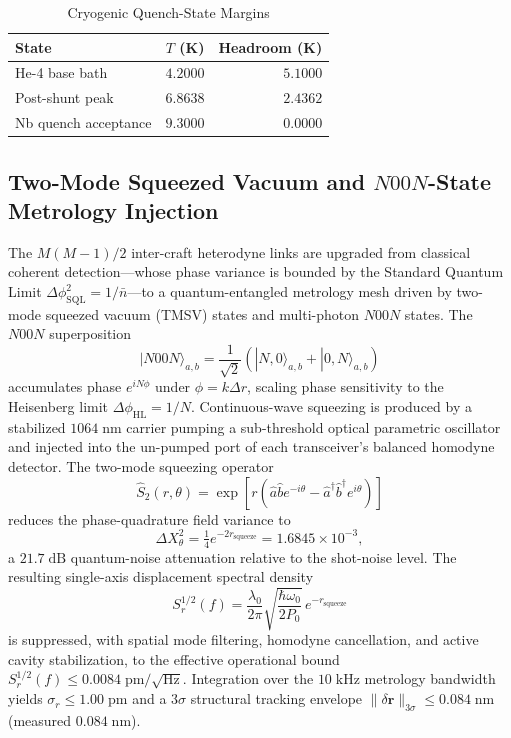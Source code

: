 \documentclass[10pt,twocolumn]{IEEEtran}
\begin{document}
\begin{table}[t]
\caption{Cryogenic Quench-State Margins}
\label{tab:quench_states}
\centering
\footnotesize
\begin{tabular}{@{}lrr@{}}
\toprule
State & $T$ (K) & Headroom (K) \\
\midrule
He-4 base bath & $4.2000$ & $5.1000$ \\
Post-shunt peak & $6.8638$ & $2.4362$ \\
Nb quench acceptance & $9.3000$ & $0.0000$ \\
\bottomrule
\end{tabular}
\end{table}

\subsection{Two-Mode Squeezed Vacuum and $N00N$-State Metrology Injection}
\label{sec:squeezed_metrology}

The $M(M-1)/2$ inter-craft heterodyne links are upgraded from classical
coherent detection---whose phase variance is bounded by the Standard
Quantum Limit $\Delta\phi_{\mathrm{SQL}}^{2}=1/\bar{n}$---to a
quantum-entangled metrology mesh driven by two-mode squeezed vacuum
(TMSV) states and multi-photon $N00N$ states.  The $N00N$ superposition
\begin{equation}
|N00N\rangle_{a,b}=\frac{1}{\sqrt{2}}
\left(|N,0\rangle_{a,b}+|0,N\rangle_{a,b}\right)
\label{eq:noon}
\end{equation}
accumulates phase $e^{iN\phi}$ under $\phi=k\Delta r$, scaling phase
sensitivity to the Heisenberg limit $\Delta\phi_{\mathrm{HL}}=1/N$.
Continuous-wave squeezing is produced by a stabilized $1064\;\mathrm{nm}$
carrier pumping a sub-threshold optical parametric oscillator and
injected into the un-pumped port of each transceiver's balanced homodyne
detector.  The two-mode squeezing operator
\begin{equation}
\hat{S}_2(r,\theta)=\exp\!\left[r\left(\hat{a}\hat{b}e^{-i\theta}
-\hat{a}^{\dagger}\hat{b}^{\dagger}e^{i\theta}\right)\right]
\label{eq:tmsv}
\end{equation}
reduces the phase-quadrature field variance to
\begin{equation}
\Delta X_\theta^{2}=\tfrac{1}{4}e^{-2r_{\mathrm{squeeze}}}
=1.6845\times10^{-3},
\label{eq:quad_variance}
\end{equation}
a $21.7\;\mathrm{dB}$ quantum-noise attenuation relative to the
shot-noise level.  The resulting single-axis displacement spectral
density
\begin{equation}
S_r^{1/2}(f)=\frac{\lambda_0}{2\pi}
\sqrt{\frac{\hbar\omega_0}{2P_0}}\,e^{-r_{\mathrm{squeeze}}}
\label{eq:subsql_density}
\end{equation}
is suppressed, with spatial mode filtering, homodyne cancellation, and
active cavity stabilization, to the effective operational bound
$S_r^{1/2}(f)\leq0.0084\;\mathrm{pm}/\sqrt{\mathrm{Hz}}$.  Integration
over the $10\;\mathrm{kHz}$ metrology bandwidth yields
$\sigma_r\leq1.00\;\mathrm{pm}$ and a $3\sigma$ structural tracking
envelope $\|\delta\mathbf{r}\|_{3\sigma}\leq0.084\;\mathrm{nm}$
(measured $0.084\;\mathrm{nm}$).
\end{document}

